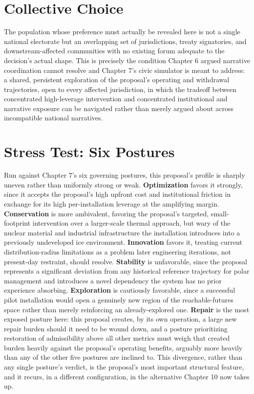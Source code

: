 \documentclass[11pt,oneside]{book}
\begin{document}
\section*{Collective Choice}

The population whose preference must actually be revealed here is not a single national electorate but an overlapping set of jurisdictions, treaty signatories, and downstream-affected communities with no existing forum adequate to the decision's actual shape. This is precisely the condition Chapter 6 argued narrative coordination cannot resolve and Chapter 7's civic simulator is meant to address: a shared, persistent exploration of the proposal's operating and withdrawal trajectories, open to every affected jurisdiction, in which the tradeoff between concentrated high-leverage intervention and concentrated institutional and narrative exposure can be navigated rather than merely argued about across incompatible national narratives.

\section*{Stress Test: Six Postures}

Run against Chapter 7's six governing postures, this proposal's profile is sharply uneven rather than uniformly strong or weak. \textbf{Optimization} favors it strongly, since it accepts the proposal's high upfront cost and institutional friction in exchange for its high per-installation leverage at the amplifying margin. \textbf{Conservation} is more ambivalent, favoring the proposal's targeted, small-footprint intervention over a larger-scale thermal approach, but wary of the nuclear material and industrial infrastructure the installation introduces into a previously undeveloped ice environment. \textbf{Innovation} favors it, treating current distribution-radius limitations as a problem later engineering iterations, not present-day restraint, should resolve. \textbf{Stability} is unfavorable, since the proposal represents a significant deviation from any historical reference trajectory for polar management and introduces a novel dependency the system has no prior experience absorbing. \textbf{Exploration} is cautiously favorable, since a successful pilot installation would open a genuinely new region of the reachable-futures space rather than merely reinforcing an already-explored one. \textbf{Repair} is the most exposed posture here: this proposal creates, by its own operation, a large new repair burden should it need to be wound down, and a posture prioritizing restoration of admissibility above all other metrics must weigh that created burden heavily against the proposal's operating benefits, arguably more heavily than any of the other five postures are inclined to. This divergence, rather than any single posture's verdict, is the proposal's most important structural feature, and it recurs, in a different configuration, in the alternative Chapter 10 now takes up.
\end{document}

